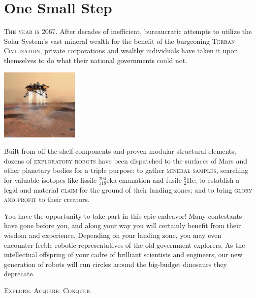 
\chapter{One Small Step}
\begin{minipage}[b]{4.25in}
\begin{slshape}
  {\large \textsc{The year is 2067}}. After decades of inefficient,
  bureaucratic attempts to utilize the Solar System's vast mineral
  wealth for the benefit of the burgeoning \textsc{Terran Civilization},
  private corporations and wealthy individuals have taken it upon
  themselves to do what their national governments could not.  
\end{slshape}
\end{minipage}
\hspace*{.25in}\includegraphics[width=1.5in]{contest/lander.eps}
\begin{slshape}

  Built from off-the-shelf components and proven modular structural
  elements, dozens of \textsc{exploratory robots} have been dispatched
  to the surfaces of Mars and other planetary bodies for a triple
  purpose: to gather \textsc{mineral samples}, searching for valuable
  isotopes like fissile $^{294}_{118}$eka-emanation and fusile $^3_2$He;
  to establish a legal and material \textsc{claim} for the ground of
  their landing zones; and to bring \textsc{glory and profit} to their
  creators.

  You have the opportunity to take part in this epic endeavor! Many
  contestants have gone before you, and along your way you will
  certainly benefit from their wisdom and experience. Depending on your
  landing zone, you may even encounter feeble robotic representatives of
  the old government explorers. As the intellectual offspring of your
  cadre of brilliant scientists and engineers, our new generation of
  robots will run circles around the big-budget dinosaurs they
  deprecate.

\centering\large\textsc{Explore. Acquire. Conquer.}

\end{slshape}

